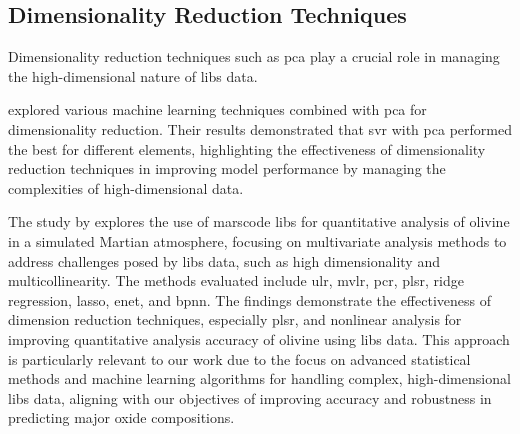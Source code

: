 \subsection{Dimensionality Reduction Techniques}
Dimensionality reduction techniques such as \gls{pca} play a crucial role in managing the high-dimensional nature of \gls{libs} data.

\citet{rezaei_dimensionality_reduction} explored various machine learning techniques combined with \gls{pca} for dimensionality reduction. Their results demonstrated that \gls{svr} with \gls{pca} performed the best for different elements, highlighting the effectiveness of dimensionality reduction techniques in improving model performance by managing the complexities of high-dimensional data.

The study by \citet{liuComparisonQuantitativeAnalysis2022} explores the use of \gls{marscode} \gls{libs} for quantitative analysis of olivine in a simulated Martian atmosphere, focusing on multivariate analysis methods to address challenges posed by \gls{libs} data, such as high dimensionality and multicollinearity.
The methods evaluated include \gls{ulr}, \gls{mvlr}, \gls{pcr}, \gls{plsr}, ridge regression, \gls{lasso}, \gls{enet}, and \gls{bpnn}.
The findings demonstrate the effectiveness of dimension reduction techniques, especially \gls{plsr}, and nonlinear analysis for improving quantitative analysis accuracy of olivine using \gls{libs} data.
This approach is particularly relevant to our work due to the focus on advanced statistical methods and machine learning algorithms for handling complex, high-dimensional \gls{libs} data, aligning with our objectives of improving accuracy and robustness in predicting major oxide compositions.




